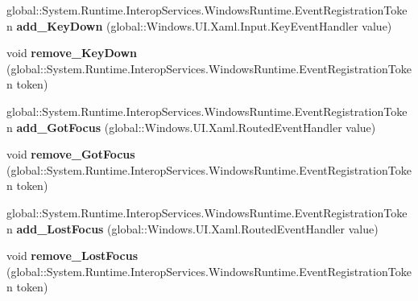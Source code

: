 \begin{DoxyCompactItemize}
\item 
\mbox{\label{interface_windows_1_1_u_i_1_1_xaml_1_1_i_u_i_element_a06c59188c0e071badb5405f835fbedd1}} 
global\+::\+System.\+Runtime.\+Interop\+Services.\+Windows\+Runtime.\+Event\+Registration\+Token {\bfseries add\+\_\+\+Key\+Down} (global\+::\+Windows.\+U\+I.\+Xaml.\+Input.\+Key\+Event\+Handler value)
\item 
\mbox{\label{interface_windows_1_1_u_i_1_1_xaml_1_1_i_u_i_element_ae7fc7bcada32e7e554fd3685ee2e4022}} 
void {\bfseries remove\+\_\+\+Key\+Down} (global\+::\+System.\+Runtime.\+Interop\+Services.\+Windows\+Runtime.\+Event\+Registration\+Token token)
\item 
\mbox{\label{interface_windows_1_1_u_i_1_1_xaml_1_1_i_u_i_element_a96e9e3b3d2456f96d2113018911c4223}} 
global\+::\+System.\+Runtime.\+Interop\+Services.\+Windows\+Runtime.\+Event\+Registration\+Token {\bfseries add\+\_\+\+Got\+Focus} (global\+::\+Windows.\+U\+I.\+Xaml.\+Routed\+Event\+Handler value)
\item 
\mbox{\label{interface_windows_1_1_u_i_1_1_xaml_1_1_i_u_i_element_ac7da9e77287c0c2d8bdfd22d90914fb3}} 
void {\bfseries remove\+\_\+\+Got\+Focus} (global\+::\+System.\+Runtime.\+Interop\+Services.\+Windows\+Runtime.\+Event\+Registration\+Token token)
\item 
\mbox{\label{interface_windows_1_1_u_i_1_1_xaml_1_1_i_u_i_element_a8eff735911e4175474bbec6b8aa79b15}} 
global\+::\+System.\+Runtime.\+Interop\+Services.\+Windows\+Runtime.\+Event\+Registration\+Token {\bfseries add\+\_\+\+Lost\+Focus} (global\+::\+Windows.\+U\+I.\+Xaml.\+Routed\+Event\+Handler value)
\item 
\mbox{\label{interface_windows_1_1_u_i_1_1_xaml_1_1_i_u_i_element_a735a5482f18ebef41ee23b3508022834}} 
void {\bfseries remove\+\_\+\+Lost\+Focus} (global\+::\+System.\+Runtime.\+Interop\+Services.\+Windows\+Runtime.\+Event\+Registration\+Token token)
\item 
\mbox{\label{interface_windows_1_1_u_i_1_1_xaml_1_1_i_u_i_element_a2fed84aaafd99d2ab6c95997a486fc7a}} 

\end{DoxyCompactItemize}
